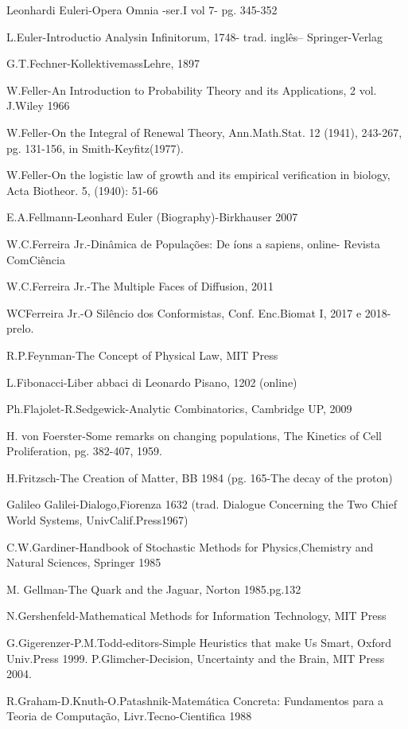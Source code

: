 Leonhardi Euleri-Opera Omnia -ser.I vol 7- pg. 345-352 

L.Euler-Introductio Analysin Infinitorum, 1748- trad. inglês– Springer-Verlag 

G.T.Fechner-KollektivemassLehre, 1897 

W.Feller-An Introduction to Probability Theory and its Applications, 2 vol. J.Wiley 1966 

W.Feller-On the Integral of Renewal Theory, Ann.Math.Stat. 12 (1941), 243-267, pg. 131-156, in Smith-Keyfitz(1977). 

W.Feller-On the logistic law of growth and its empirical verification in biology, Acta Biotheor. 5, (1940): 51-66 

E.A.Fellmann-Leonhard Euler (Biography)-Birkhauser 2007 

W.C.Ferreira Jr.-Dinâmica de Populações: De íons a sapiens, online- Revista ComCiência 

W.C.Ferreira Jr.-The Multiple Faces of Diffusion, 2011 

WCFerreira Jr.-O Silêncio dos Conformistas, Conf. Enc.Biomat I, 2017 e 2018-prelo. 

R.P.Feynman-The Concept of Physical Law, MIT Press 

L.Fibonacci-Liber abbaci di Leonardo Pisano, 1202 (online) 

Ph.Flajolet-R.Sedgewick-Analytic Combinatorics, Cambridge UP, 2009 

H. von Foerster-Some remarks on changing populations, The Kinetics of Cell Proliferation, pg. 382-407, 1959. 

H.Fritzsch-The Creation of Matter, BB 1984 (pg. 165-The decay of the proton) 

Galileo Galilei-Dialogo,Fiorenza 1632 (trad. Dialogue Concerning the Two Chief World Systems, UnivCalif.Press1967) 

C.W.Gardiner-Handbook of Stochastic Methods for Physics,Chemistry and Natural Sciences, Springer 1985 

M. Gellman-The Quark and the Jaguar, Norton 1985.pg.132 

N.Gershenfeld-Mathematical Methods for Information Technology, MIT Press 

G.Gigerenzer-P.M.Todd-editors-Simple Heuristics that make Us Smart, Oxford Univ.Press 1999. 
P.Glimcher-Decision, Uncertainty and the Brain, MIT Press 2004. 

R.Graham-D.Knuth-O.Patashnik-Matemática Concreta: Fundamentos para a Teoria de Computação, Livr.Tecno-Cientifica 1988 

